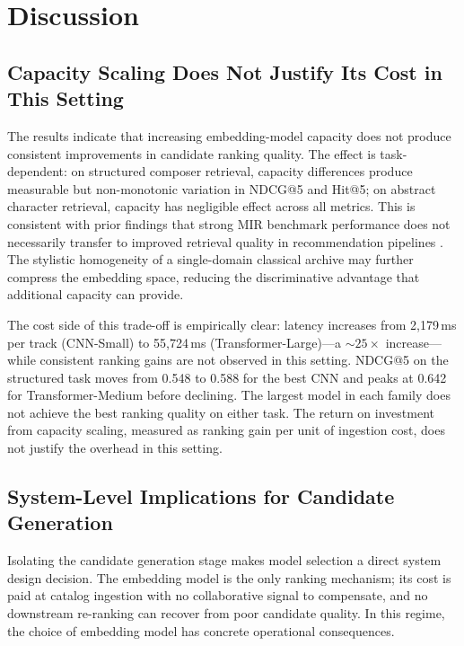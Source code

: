 \documentclass[sigconf]{acmart}
\begin{document}
\section{Discussion}

\subsection{Capacity Scaling Does Not Justify Its Cost in This Setting}

The results indicate that increasing embedding-model capacity does not produce consistent improvements in candidate ranking quality. The effect is task-dependent: on structured composer retrieval, capacity differences produce measurable but non-monotonic variation in NDCG@5 and Hit@5; on abstract character retrieval, capacity has negligible effect across all metrics. This is consistent with prior findings that strong MIR benchmark performance does not necessarily transfer to improved retrieval quality in recommendation pipelines \cite{tamm2024}. The stylistic homogeneity of a single-domain classical archive may further compress the embedding space, reducing the discriminative advantage that additional capacity can provide.

The cost side of this trade-off is empirically clear: latency increases from 2{,}179\,ms per track (CNN-Small) to 55{,}724\,ms (Transformer-Large)---a ${\sim}25{\times}$ increase---while consistent ranking gains are not observed in this setting. NDCG@5 on the structured task moves from 0.548 to 0.588 for the best CNN and peaks at 0.642 for Transformer-Medium before declining. The largest model in each family does not achieve the best ranking quality on either task. The return on investment from capacity scaling, measured as ranking gain per unit of ingestion cost, does not justify the overhead in this setting.

\subsection{System-Level Implications for Candidate Generation}

Isolating the candidate generation stage makes model selection a direct system design decision. The embedding model is the only ranking mechanism; its cost is paid at catalog ingestion with no collaborative signal to compensate, and no downstream re-ranking can recover from poor candidate quality. In this regime, the choice of embedding model has concrete operational consequences.
\end{document}
